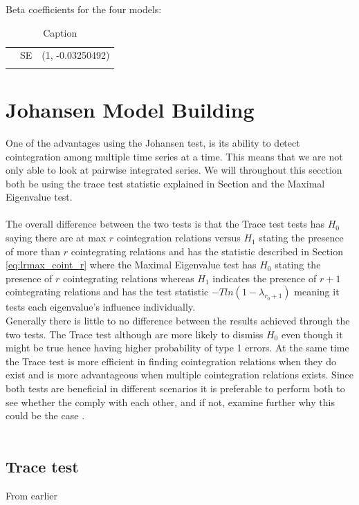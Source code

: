 Beta coefficients for the four models:
\begin{table}[]
    \centering
    \begin{tabular}{c|c|c}
       & SE & (1, -0.03250492) \\
       &  & 
    \end{tabular}
    \caption{Caption}
    \label{tab:my_label}
\end{table}  




\section{Johansen Model Building}
One of the advantages using the Johansen test, is its ability to detect cointegration among multiple time series at a time. This means that we are not only able to look at pairwise integrated series. We will throughout this secction both be using the trace test statistic explained in Section \cite{Johansen_test} and the Maximal Eigenvalue test. \\\\
The overall difference between the two tests is that the Trace test tests has $H_0$ saying there are at max $r$ cointegration relations versus $H_1$ stating the presence of more than $r$ cointegrating relations and has the statistic described in Section \cite{Johansen_test} \eqref{eq:lrmax_coint_r} where the Maximal Eigenvalue test has $H_0$ stating the presence of $r$ cointegrating relations whereas $H_1$ indicates the presence of $r+1$ cointegrating relations and has the test statistic $-Tln(1-\lambda_{r_0+1})$ meaning it tests each eigenvalue's influence individually.\\
Generally there is little to no difference between the results achieved through the two tests. The Trace test although are more likely to dismiss $H_0$ even though it might be true hence having higher probability of type 1 errors. At the same time the Trace test is more efficient in finding cointegration relations when they do exist and is more advantageous when multiple cointegration relations exists. Since both tests are beneficial in different scenarios it is preferable to perform both to see whether the comply with each other, and if not, examine further why this could be the case \citep{johansentestdifferences}.\\\\

\subsection{Trace test}
From earlier 




